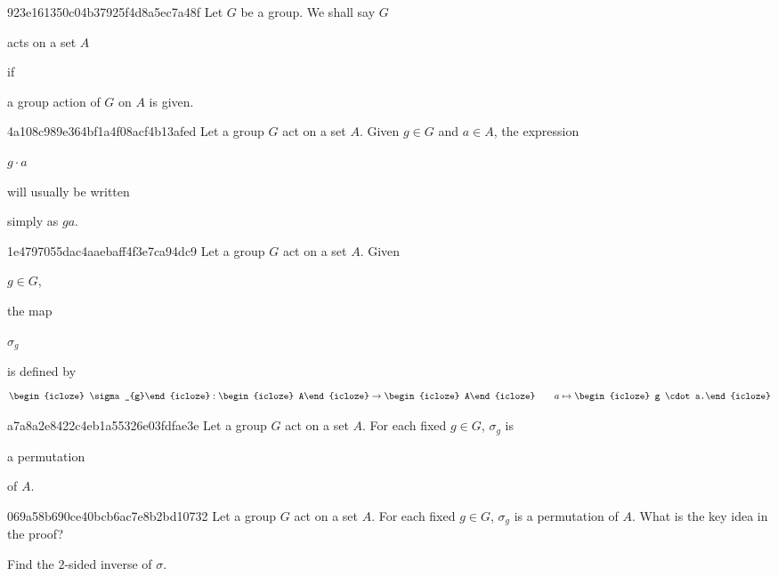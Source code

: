 \begin{note}{923e161350c04b37925f4d8a5ec7a48f}
    Let \({ G }\) be a group. We shall say \({ G }\) \begin{icloze}{2}acts on a set \({ A }\)\end{icloze} if \begin{icloze}{1}a group action of \({ G }\) on \({ A }\) is given.\end{icloze}
\end{note}

\begin{note}{4a108c989e364bf1a4f08acf4b13afed}
    Let a group \({ G }\) act on a set \({ A }\).
    Given \({ g \in G }\) and \({ a \in A }\), the expression \begin{icloze}{2}\({ g \cdot a }\)\end{icloze} will usually be written \begin{icloze}{1}simply as \({ ga }\).\end{icloze}
\end{note}

\begin{note}{1e4797055dac4aaebaff4f3e7ca94dc9}
    Let a group \({ G }\) act on a set \({ A }\).
    Given \begin{icloze}{4}\({ g \in G }\),\end{icloze} the map \begin{icloze}{3}\({ \sigma_{g} }\)\end{icloze} is defined by
    \[
        \begin{icloze}{3}\sigma_{g}\end{icloze} : \begin{icloze}{2}A\end{icloze} \to \begin{icloze}{2}A\end{icloze}  \qquad a \mapsto \begin{icloze}{1}g \cdot a.\end{icloze}
    \]
\end{note}

\begin{note}{a7a8a2e8422c4eb1a55326e03fdfae3e}
    Let a group \({ G }\) act on a set \({ A }\).
    For each fixed \({ g \in G }\), \({ \sigma_{g} }\) is \begin{icloze}{1}a permutation\end{icloze} of \({ A }\).
\end{note}

\begin{note}{069a58b690ce40bcb6ac7e8b2bd10732}
    Let a group \({ G }\) act on a set \({ A }\).
    For each fixed \({ g \in G }\), \({ \sigma_{g} }\) is a permutation of \({ A }\).
    What is the key idea in the proof?

    \begin{cloze}{1}
        Find the \({ 2 }\)-sided inverse of \({ \sigma }\).
    \end{cloze}
\end{note}

